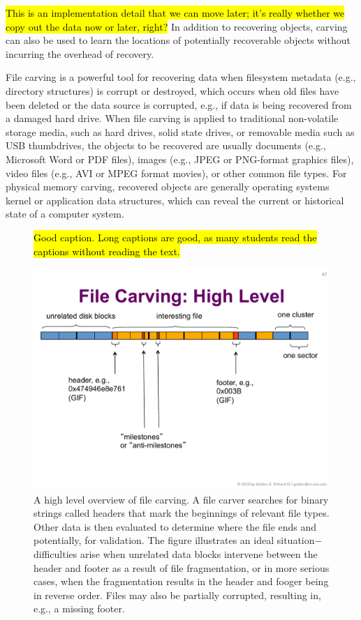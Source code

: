 \hl{This is an implementation detail that we can move later; it's
  really whether we copy out the data now or later, right?} In addition to recovering objects, carving can also be used to 
learn the locations of potentially recoverable objects without
incurring the overhead of recovery. 

File carving is a powerful tool for recovering data when filesystem
metadata (e.g., directory structures) is corrupt or destroyed, which
occurs when old files have been deleted or the data source is
corrupted, e.g., if data is being recovered from a damaged hard drive.
When file carving is applied to traditional non-volatile storage
media, such as hard drives, solid state drives, or removable media
such as USB thumbdrives, the objects to be recovered are usually
documents (e.g., Microsoft Word or PDF files), images (e.g., JPEG or
PNG-format graphics files), video files (e.g., AVI or MPEG format
movies), or other common file types.  For physical memory carving,
recovered objects are generally operating systems kernel or
application data structures, which can reveal the current or historical
state of a computer system.


\begin{figure}[ht]
\hl{Good caption. Long captions are good, as many students read the
  captions without reading the text.}
\begin{center}
\includegraphics[width=140mm]{ch-carving/carvingoverview.pdf}
\end{center}
\caption{A high level overview of file carving.  A file carver
  searches for binary strings called headers that mark the beginnings
  of relevant file types.  Other data is then evaluated to determine
  where the file ends and potentially, for validation.  The figure
  illustrates an ideal situation$-$difficulties arise when unrelated
  data blocks intervene between the header and footer as a result of
  file fragmentation, or in more serious cases, when the fragmentation
  results in the header and fooger being in reverse order.  Files may
  also be partially corrupted, resulting in, e.g., a missing footer.} 
\label{fig:carvingoverview}
\end{figure}

